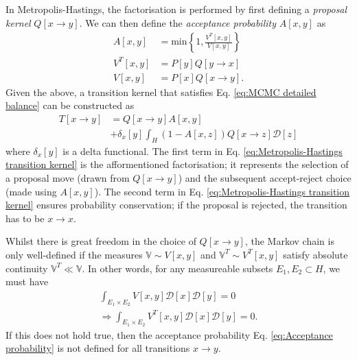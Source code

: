 In Metropolis-Hastings, the factorisation is performed by first defining a \textit{proposal kernel} $Q[x \to y]$. We can then define the \textit{acceptance probability} $A[x,y]$ as
\begin{subequations} \label{eq:MCMC acceptance probability}
\begin{align}
A[x,y] & = \text{min}\left\{ 1,
\frac{V^T[x,y]}{V[x,y]}
\right\} \label{eq:Acceptance probability} \\
V^T[x,y] & = P[y] Q[y \to x]  \\
V[x,y] & = P[x] Q[x \to y].
\end{align}
\end{subequations}
Given the above, a transition kernel that satisfies Eq. \ref{eq:MCMC detailed balance} can be constructed as
\begin{equation} \label{eq:Metropolis-Hastings transition kernel}
\begin{aligned}
T[x \to y] & = Q[x \to y] A[x,y] \\
& + \delta_{x}[y] \int_H (1 - A[x,z]) Q[x \to z] \mathcal{D}[z]
\end{aligned}
\end{equation}
where $\delta_{x}[y]$ is a delta functional. The first term in Eq. \ref{eq:Metropolis-Hastings transition kernel} is the afformentioned factorisation; it represents the selection of a proposal move (drawn from $Q[ x\to y]$) and the subsequent accept-reject choice (made using $A[x,y]$). The second term in Eq. \ref{eq:Metropolis-Hastings transition kernel} ensures probability conservation; if the proposal is rejected, the transition has to be $x \to x$.

Whilst there is great freedom in the choice of $Q[x \to y]$, the Markov chain is only well-defined if the measures $\mathbb{V} \sim V[x,y]$ and $\mathbb{V}^T \sim V^T[x,y]$ satisfy absolute continuity $\mathbb{V}^T \ll \mathbb{V}$. In other words, for any measureable subsets $E_1, E_2 \subset H$, we must have
\begin{equation} \label{eq:MCMC absolute continuity}
\begin{aligned}
\int_{E_1 \times E_2} V[x,y] \mathcal{D}[x] \mathcal{D}[y] = 0 \\
 \Rightarrow \int_{E_1 \times E_2} V^T[x,y] \mathcal{D}[x] \mathcal{D}[y] = 0.
\end{aligned}
\end{equation}
If this does not hold true, then the acceptance probability Eq. \ref{eq:Acceptance probability} is not defined for all transitions $x \to y$.

